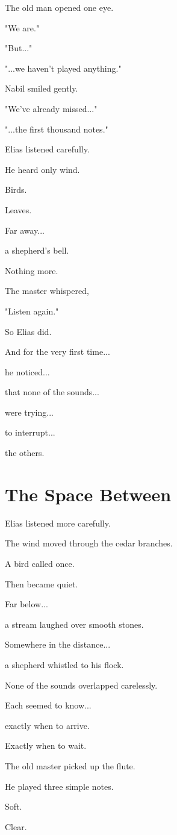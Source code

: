 \documentclass[12pt,openany]{book}
\begin{document}
The old man opened one eye.

"We are."

"But..."

"...we haven't played anything."

Nabil smiled gently.

"We've already missed..."

"...the first thousand notes."

Elias listened carefully.

He heard only wind.

Birds.

Leaves.

Far away...

a shepherd's bell.

Nothing more.

The master whispered,

"Listen again."

So Elias did.

And for the very first time...

he noticed...

that none of the sounds...

were trying...

to interrupt...

the others.
\section*{The Space Between}

Elias listened more carefully.

The wind moved through the cedar branches.

A bird called once.

Then became quiet.

Far below...

a stream laughed over smooth stones.

Somewhere in the distance...

a shepherd whistled to his flock.

None of the sounds overlapped carelessly.

Each seemed to know...

exactly when to arrive.

Exactly when to wait.

The old master picked up the flute.

He played three simple notes.

Soft.

Clear.
\end{document}

